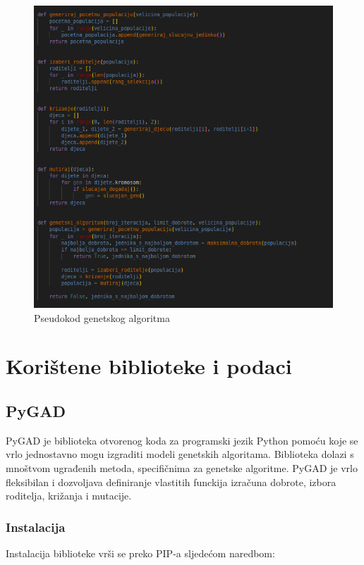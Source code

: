 \documentclass[times, utf8, zavrsni, numeric]{fer}
\begin{document}
\begin{figure}[htb]
\centering
\includegraphics[width=14cm]{images/genetski_algoritam_pseudokod.png}
\caption{Pseudokod genetskog algoritma}
\label{fig:pseudokod genetskog algoritma}
\end{figure}

\chapter{Korištene biblioteke i podaci}

\section{PyGAD}
PyGAD je biblioteka otvorenog koda za programski jezik Python pomoću koje se vrlo jednostavno mogu izgraditi modeli genetskih algoritama. Biblioteka dolazi s mnoštvom ugrađenih metoda, specifičnima za genetske algoritme. PyGAD je vrlo fleksibilan i dozvoljava definiranje vlastitih funckija izračuna dobrote, izbora roditelja, križanja i mutacije.

\subsection{Instalacija}
Instalacija biblioteke vrši se preko PIP-a sljedećom naredbom:
\end{document}
